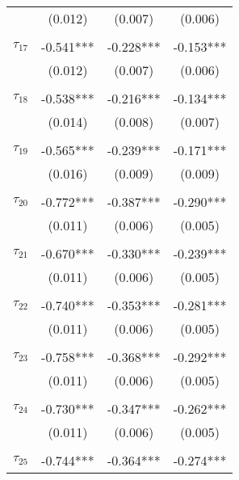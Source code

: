 \begin{tabular}{@{\extracolsep{-0pt}}lccc}
                &  (0.012)  &  (0.007)  &  (0.006)  \\
                &           &           &           \\[-2.1ex]
$\tau_{17}$     & -0.541*** & -0.228*** & -0.153*** \\
                &  (0.012)  &  (0.007)  &  (0.006)  \\
                &           &           &           \\[-2.1ex]
$\tau_{18}$     & -0.538*** & -0.216*** & -0.134*** \\
                &  (0.014)  &  (0.008)  &  (0.007)  \\
                &           &           &           \\[-2.1ex]
$\tau_{19}$     & -0.565*** & -0.239*** & -0.171*** \\
                &  (0.016)  &  (0.009)  &  (0.009)  \\
                &           &           &           \\[-2.1ex]
$\tau_{20}$     & -0.772*** & -0.387*** & -0.290*** \\
                &  (0.011)  &  (0.006)  &  (0.005)  \\
                &           &           &           \\[-2.1ex]
$\tau_{21}$     & -0.670*** & -0.330*** & -0.239*** \\
                &  (0.011)  &  (0.006)  &  (0.005)  \\
                &           &           &           \\[-2.1ex]
$\tau_{22}$     & -0.740*** & -0.353*** & -0.281*** \\
                &  (0.011)  &  (0.006)  &  (0.005)  \\
                &           &           &           \\[-2.1ex]
$\tau_{23}$     & -0.758*** & -0.368*** & -0.292*** \\
                &  (0.011)  &  (0.006)  &  (0.005)  \\
                &           &           &           \\[-2.1ex]
$\tau_{24}$     & -0.730*** & -0.347*** & -0.262*** \\
                &  (0.011)  &  (0.006)  &  (0.005)  \\
                &           &           &           \\[-2.1ex]
$\tau_{25}$     & -0.744*** & -0.364*** & -0.274*** \\

\end{tabular}
